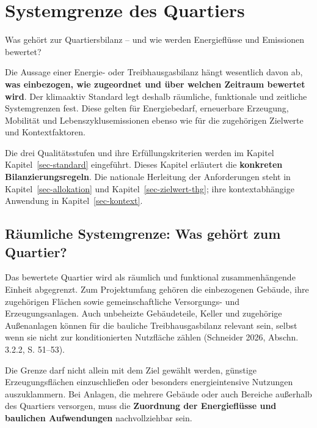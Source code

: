 \documentclass[
  ngerman,
  a4paper,
  DIV=11]{scrreprt}
\begin{document}
\chapter{Systemgrenze des Quartiers}\label{sec-bilanzregeln}

Was gehört zur Quartiersbilanz -- und wie werden Energieflüsse und
Emissionen bewertet?

Die Aussage einer Energie- oder Treibhausgasbilanz hängt wesentlich
davon ab, \textbf{was einbezogen, wie zugeordnet und über welchen
Zeitraum bewertet wird}. Der klimaaktiv Standard legt deshalb räumliche,
funktionale und zeitliche Systemgrenzen fest. Diese gelten für
Energiebedarf, erneuerbare Erzeugung, Mobilität und
Lebenszyklusemissionen ebenso wie für die zugehörigen Zielwerte und
Kontextfaktoren.

Die drei Qualitätsstufen und ihre Erfüllungskriterien werden im Kapitel
Kapitel~\ref{sec-standard} eingeführt. Dieses Kapitel erläutert die
\textbf{konkreten Bilanzierungsregeln}. Die nationale Herleitung der
Anforderungen steht in Kapitel~\ref{sec-allokation} und
Kapitel~\ref{sec-zielwert-thg}; ihre kontextabhängige Anwendung in
Kapitel~\ref{sec-kontext}.

\section{Räumliche Systemgrenze: Was gehört zum
Quartier?}\label{ruxe4umliche-systemgrenze-was-gehuxf6rt-zum-quartier}

Das bewertete Quartier wird als räumlich und funktional zusammenhängende
Einheit abgegrenzt. Zum Projektumfang gehören die einbezogenen Gebäude,
ihre zugehörigen Flächen sowie gemeinschaftliche Versorgungs- und
Erzeugungsanlagen. Auch unbeheizte Gebäudeteile, Keller und zugehörige
Außenanlagen können für die bauliche Treibhausgasbilanz relevant sein,
selbst wenn sie nicht zur konditionierten Nutzfläche zählen (Schneider
2026, Abschn. 3.2.2, S. 51--53).

\begin{tcolorbox}[enhanced jigsaw, arc=.35mm, bottomrule=.15mm, bottomtitle=1mm, breakable, colback=white, colbacktitle=quarto-callout-important-color!10!white, colframe=quarto-callout-important-color-frame, coltitle=black, left=2mm, leftrule=.75mm, opacityback=0, opacitybacktitle=0.6, rightrule=.15mm, title=\textcolor{quarto-callout-important-color}{\faExclamation}\hspace{0.5em}{Wichtig}, titlerule=0mm, toprule=.15mm, toptitle=1mm]

Die Grenze darf nicht allein mit dem Ziel gewählt werden, günstige
Erzeugungsflächen einzuschließen oder besonders energieintensive
Nutzungen auszuklammern. Bei Anlagen, die mehrere Gebäude oder auch
Bereiche außerhalb des Quartiers versorgen, muss die \textbf{Zuordnung
der Energieflüsse und baulichen Aufwendungen} nachvollziehbar sein.

\end{tcolorbox}
\end{document}
